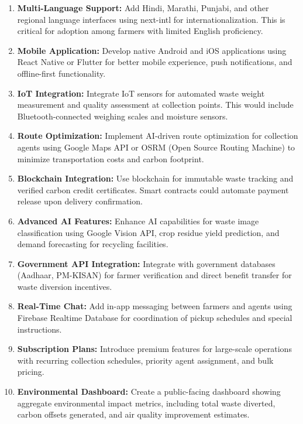 \documentclass[a4paper,12pt,oneside]{report}
\let\originalitem\item
\renewcommand{\item}{\Needspace{10\baselineskip}\originalitem}
\begin{document}
\begin{enumerate}
    \item \textbf{Multi-Language Support:} Add Hindi, Marathi, Punjabi, and other regional language interfaces using next-intl for internationalization. This is critical for adoption among farmers with limited English proficiency.

    \item \textbf{Mobile Application:} Develop native Android and iOS applications using React Native or Flutter for better mobile experience, push notifications, and offline-first functionality.

    \item \textbf{IoT Integration:} Integrate IoT sensors for automated waste weight measurement and quality assessment at collection points. This would include Bluetooth-connected weighing scales and moisture sensors.

    \item \textbf{Route Optimization:} Implement AI-driven route optimization for collection agents using Google Maps API or OSRM (Open Source Routing Machine) to minimize transportation costs and carbon footprint.

    \item \textbf{Blockchain Integration:} Use blockchain for immutable waste tracking and verified carbon credit certificates. Smart contracts could automate payment release upon delivery confirmation.

    \item \textbf{Advanced AI Features:} Enhance AI capabilities for waste image classification using Google Vision API, crop residue yield prediction, and demand forecasting for recycling facilities.

    \item \textbf{Government API Integration:} Integrate with government databases (Aadhaar, PM-KISAN) for farmer verification and direct benefit transfer for waste diversion incentives.

    \item \textbf{Real-Time Chat:} Add in-app messaging between farmers and agents using Firebase Realtime Database for coordination of pickup schedules and special instructions.

    \item \textbf{Subscription Plans:} Introduce premium features for large-scale operations with recurring collection schedules, priority agent assignment, and bulk pricing.

    \item \textbf{Environmental Dashboard:} Create a public-facing dashboard showing aggregate environmental impact metrics, including total waste diverted, carbon offsets generated, and air quality improvement estimates.


\end{enumerate}
\end{document}
